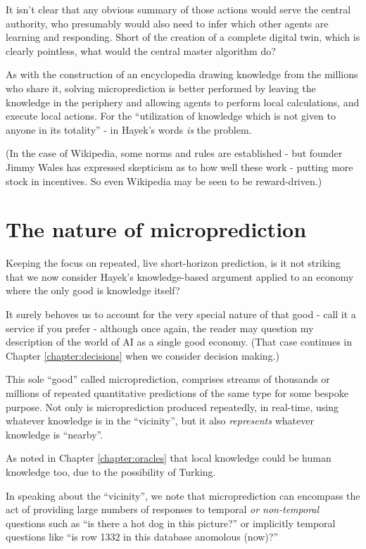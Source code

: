 It isn't clear that any obvious summary of those actions would serve the central authority, who presumably would also need to infer which other agents are learning and responding. Short of the creation of a complete digital twin, which is clearly pointless, what would the central master algorithm do? 

As with the construction of an encyclopedia drawing knowledge from the millions who share it, solving microprediction is better performed by leaving the knowledge in the periphery and allowing agents to perform local calculations, and execute local actions. For the  ``utilization of knowledge which is not given to anyone in its totality'' - in Hayek's words {\em is} the problem.  

(In the case of Wikipedia, some norms and rules are established - but founder Jimmy Wales has expressed skepticism as to how well these work - putting more stock in incentives. So even Wikipedia may be seen to be reward-driven.) 


\section{The nature of microprediction}

Keeping the focus on repeated, live short-horizon prediction, is it not striking that we now consider Hayek's knowledge-based argument applied to an economy where the only good is knowledge itself? 

It surely behoves us to account for the very special nature of that good - call it a service if you prefer - although once again, the reader may question my description of the world of AI as a single good economy. (That case continues in Chapter \ref{chapter:decisions} when we consider decision making.)


This sole ``good'' called microprediction, comprises streams of thousands or millions of repeated quantitative predictions of the same type for some bespoke purpose. Not only is microprediction produced repeatedly, in real-time, using whatever knowledge is in the ``vicinity'', but it also {\em represents} whatever knowledge is ``nearby''. 


As noted in Chapter \ref{chapter:oracles} that local knowledge could be human knowledge too, due to the possibility of Turking. 


In speaking about the ``vicinity'', we note that microprediction can encompass the act of providing large numbers of responses to temporal {\em or non-temporal} questions such as “is there a hot dog in this picture?” or implicitly temporal questions like “is row 1332 in this database anomolous (now)?” 

